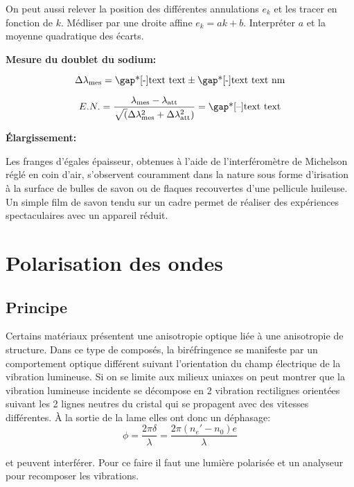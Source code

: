 \documentclass[french]{article}
\begin{document}
On peut aussi relever la position des différentes annulations $e_k$ et les tracer en fonction de $k$. Médliser par une droite affine $e_k = ak + b$. Interpréter $a$ et la moyenne quadratique des écarts.

\begin{theo}
	\textbf{Mesure du doublet du sodium:}\vspace{.5cm}

	\[\Delta \lambda_{\rm mes} = \text{\gap*[-]{text text}} \pm \text{\gap*[-]{text text}} \text{ nm}\]
\end{theo}

\[E.N. = \frac{\lambda_{\rm mes}- \lambda_{\rm att}}{\sqrt(\Delta \lambda_{\rm mes}^2+\Delta \lambda_{\rm att}^2 )} = \text{\gap*[--]{text text}}\]


\noindent \textbf{Élargissement:}\vspace{.5cm}

Les franges d'égales épaisseur, obtenues à l'aide de l'interféromètre de Michelson réglé en coin d'air, s'observent couramment dans la nature sous forme d'irisation à la surface de bulles de savon ou de flaques recouvertes d'une pellicule huileuse. Un simple film de savon tendu sur un cadre permet de réaliser des expériences spectaculaires avec un appareil réduit.

\section{Polarisation des ondes}

\subsection{Principe}

Certains matériaux présentent une anisotropie optique liée à une anisotropie de structure. Dans ce type de composés, la biréfringence se manifeste par un comportement optique différent suivant l'orientation du champ électrique de la vibration lumineuse. Si on se limite aux milieux uniaxes on peut montrer que la vibration lumineuse incidente se décompose en 2 vibration rectilignes orientées suivant les 2 lignes neutres du cristal qui se propagent avec des vitesses différentes. À la sortie de la lame elles ont donc un déphasage:
\begin{equation}
	\phi = \frac{2\pi\delta}{\lambda} = \frac{2\pi(n_e'-n_0)e}{\lambda}
\end{equation}

et peuvent interférer. Pour ce faire il faut une lumière polarisée et un analyseur pour recomposer les vibrations.
\end{document}
